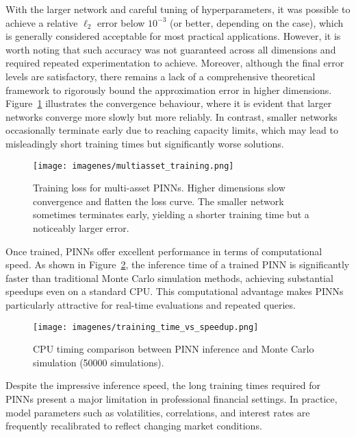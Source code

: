 \documentclass[12pt]{report} %
\theoremstyle{plain} %
\theoremstyle{definition} %
\theoremstyle{remark} %
\begin{document}
With the larger network and careful tuning of hyperparameters, it was possible to achieve a 
relative \(\ell_2\) error below \(10^{-3}\) (or better, depending on the case), which is generally considered 
acceptable for most practical applications. However, it is worth noting that such accuracy was not guaranteed 
across all dimensions and required repeated experimentation to achieve. Moreover, although 
the final error levels are satisfactory, there remains a lack of a comprehensive theoretical 
framework to rigorously bound the approximation error in higher dimensions. 
Figure~\ref{fig:multiasset_training} illustrates the convergence behaviour, where it is evident 
that larger networks converge more slowly but more reliably. In contrast, smaller networks 
occasionally terminate early due to reaching capacity limits, which may lead to misleadingly 
short training times but significantly worse solutions.

\begin{figure}[H]
 \centering
 \texttt{[image: imagenes/multiasset\_training.png]}
 \caption{Training loss for multi-asset PINNs. Higher dimensions slow convergence and 
	flatten the loss curve. The smaller network sometimes terminates early, yielding a shorter 
	training time but a noticeably larger error.}
 \label{fig:multiasset_training}
\end{figure}

Once trained, PINNs offer excellent performance in terms of computational speed. 
As shown in Figure~\ref{fig:speedup}, the inference time of a trained PINN is significantly 
faster than traditional Monte Carlo simulation methods, achieving substantial speedups even 
on a standard CPU. This computational advantage makes PINNs particularly attractive for real-time 
evaluations and repeated queries.

\begin{figure}[H]
 \centering
 \texttt{[image: imagenes/training\_time\_vs\_speedup.png]}
 \caption{CPU timing comparison between PINN inference and Monte Carlo simulation (50000 simulations).}
 \label{fig:speedup}
\end{figure}

Despite the impressive inference speed, the long training times required for PINNs present a 
major limitation in professional financial settings. In practice, model parameters such 
as volatilities, correlations, and interest rates are frequently recalibrated to reflect changing market conditions. 
\end{document}
